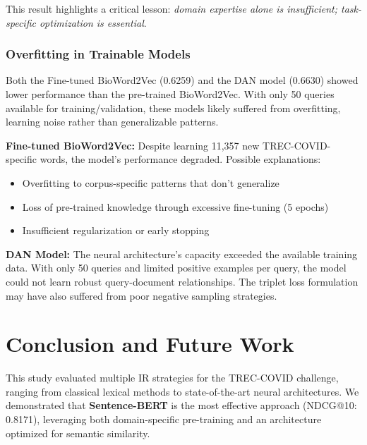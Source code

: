 \documentclass[sigconf,nonacm]{acmart}
\begin{document}
This result highlights a critical lesson: \textit{domain expertise alone is insufficient; task-specific optimization is essential}.

\subsubsection{Overfitting in Trainable Models}
Both the Fine-tuned BioWord2Vec (0.6259) and the DAN model (0.6630) showed lower performance than the pre-trained BioWord2Vec. With only 50 queries available for training/validation, these models likely suffered from overfitting, learning noise rather than generalizable patterns.

\textbf{Fine-tuned BioWord2Vec:} Despite learning 11,357 new TREC-COVID-specific words, the model's performance degraded. Possible explanations:
\begin{itemize}
    \item Overfitting to corpus-specific patterns that don't generalize
    \item Loss of pre-trained knowledge through excessive fine-tuning (5 epochs)
    \item Insufficient regularization or early stopping
\end{itemize}

\textbf{DAN Model:} The neural architecture's capacity exceeded the available training data. With only 50 queries and limited positive examples per query, the model could not learn robust query-document relationships. The triplet loss formulation may have also suffered from poor negative sampling strategies.



\section{Conclusion and Future Work}
This study evaluated multiple IR strategies for the TREC-COVID challenge, ranging from classical lexical methods to state-of-the-art neural architectures. We demonstrated that \textbf{Sentence-BERT} is the most effective approach (NDCG@10: 0.8171), leveraging both domain-specific pre-training and an architecture optimized for semantic similarity.
\end{document}
